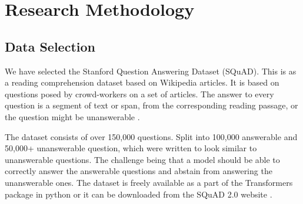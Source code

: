 \documentclass[a4paper,12pt]{report}
\begin{document}





    \chapter{Research Methodology}\label{c3researchmeth}
    
    
    
    \section{Data Selection}\label{c31}

    	We have selected the Stanford Question Answering Dataset (SQuAD). This is as a reading comprehension dataset based on Wikipedia articles. It is based on questions posed by crowd-workers on a set of articles. The answer to every question is a segment of text or span, from the corresponding reading passage, or the question might be unanswerable \citep{dataset}.

    	The dataset consists of over 150,000 questions. Split into 100,000 answerable and 50,000+ unanswerable question, which were written to look similar to unanswerable questions. The challenge being that a model should be able to correctly answer the answerable questions and abstain from answering the unanswerable ones.
	    The dataset is freely available as a part of the Transformers package in python or it can be downloaded from the SQuAD 2.0 website \citep{squad}.
\end{document}
